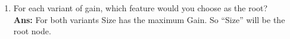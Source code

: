 \documentclass[12pt, fullpage,letterpaper]{article}
\begin{document}
\begin{enumerate}
\begin{itemize}
\end{itemize}
\item \relax[2 points] For each variant of gain, which feature would
  you choose as the root?\\
  \textbf{Ans: }For both variants Size has the maximum Gain. So ``Size'' will be the root node.
\end{enumerate}
\end{document}

